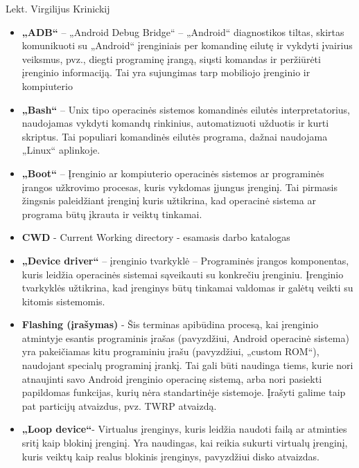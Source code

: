 \documentclass[a4paper,12pt,fleqn]{article}
\begin{document}
 {}{}{}{}%
 {Lekt. Virgilijus Krinickij}

\tableofcontents


 \begin{itemize}
     \item \textbf{„ADB“} – „Android Debug Bridge“ – „Android“ diagnostikos tiltas, skirtas komunikuoti su „Android“ įrenginiais per komandinę eilutę ir vykdyti įvairius veiksmus, pvz., diegti programinę įrangą, siųsti komandas ir peržiūrėti įrenginio informaciją. Tai yra sujungimas tarp mobiliojo įrenginio ir kompiuterio
     \item \textbf{„Bash“} – Unix tipo operacinės sistemos komandinės eilutės interpretatorius, naudojamas vykdyti komandų rinkinius, automatizuoti užduotis ir kurti skriptus. Tai populiari komandinės eilutės programa, dažnai naudojama „Linux“ aplinkoje.
     \item \textbf{„Boot“} – Įrenginio ar kompiuterio operacinės sistemos ar programinės įrangos užkrovimo procesas, kuris vykdomas įjungus įrenginį. Tai pirmasis žingsnis paleidžiant įrenginį kuris užtikrina, kad operacinė sistema ar programa būtų įkrauta ir veiktų tinkamai.
     \item \textbf{CWD} - Current Working directory - esamasis darbo katalogas
     \item \textbf{„Device driver“} – įrenginio tvarkyklė – Programinės įrangos komponentas, kuris leidžia operacinės sistemai sąveikauti su konkrečiu įrenginiu. Įrenginio tvarkyklės užtikrina, kad įrenginys būtų tinkamai valdomas ir galėtų veikti su kitomis sistemomis.
     \item \textbf{Flashing (įrašymas)} - Šis terminas apibūdina procesą, kai įrenginio atmintyje esantis programinis įrašas (pavyzdžiui, Android operacinė sistema) yra pakeičiamas kitu programiniu įrašu (pavyzdžiui, „custom ROM“), naudojant specialų programinį įrankį. Tai gali būti naudinga tiems, kurie nori atnaujinti savo Android įrenginio operacinę sistemą, arba nori pasiekti papildomas funkcijas, kurių nėra standartinėje sistemoje. Įrašyti galime taip pat particijų atvaizdus, pvz. TWRP atvaizdą.
     \item \textbf{„Loop device“}- Virtualus įrenginys, kuris leidžia naudoti failą ar atminties sritį kaip blokinį įrenginį. Yra naudingas, kai reikia sukurti virtualų įrenginį, kuris veiktų kaip realus blokinis įrenginys, pavyzdžiui disko atvaizdas.

\end{itemize}
\end{document}
